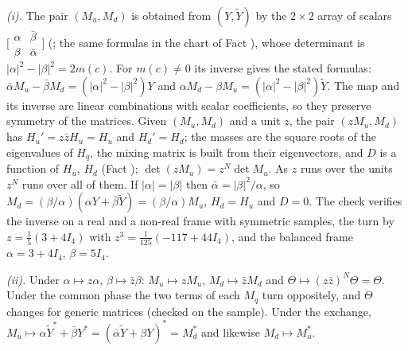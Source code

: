 \emph{(i).} The pair $(M_{u}, M_{d})$ is obtained from $(Y, \tilde{Y})$ by the $2 \times 2$ array of scalars $\bigl[\begin{smallmatrix}\alpha & \bar{\beta} \\ \beta & \bar{\alpha}\end{smallmatrix}\bigr]$ (; the same formulas in the chart of Fact ), whose determinant is $|\alpha|^{2} - |\beta|^{2} = 2m(c)$. For $m(c) \neq 0$ its inverse gives the stated formulas: $\bar{\alpha}M_{u} - \bar{\beta}M_{d} = (|\alpha|^{2} - |\beta|^{2})Y$ and $\alpha M_{d} - \beta M_{u} = (|\alpha|^{2} - |\beta|^{2})\tilde{Y}$. The map and its inverse are linear combinations with scalar coefficients, so they preserve symmetry of the matrices. Given $(M_{u}, M_{d})$ and a unit $z$, the pair $(zM_{u}, M_{d})$ has $H_{u}' = z\bar{z}H_{u} = H_{u}$ and $H_{d}' = H_{d}$; the masses are the square roots of the eigenvalues of $H_{q}$, the mixing matrix is built from their eigenvectors, and $D$ is a function of $H_{u}$, $H_{d}$ (Fact ); $\det(zM_{u}) = z^{N}\det M_{u}$. As $z$ runs over the units $z^{N}$ runs over all of them. If $|\alpha| = |\beta|$ then $\bar{\alpha} = |\beta|^{2}/\alpha$, so $M_{d} = (\beta/\alpha)(\alpha Y + \bar{\beta}\tilde{Y}) = (\beta/\alpha)M_{u}$, $H_{d} = H_{u}$ and $D = 0$. The check verifies the inverse on a real and a non-real frame with symmetric samples, the turn by $z = \tfrac15(3 + 4I_{4})$ with $z^{3} = \tfrac{1}{125}(-117 + 44I_{4})$, and the balanced frame $\alpha = 3 + 4I_{4}$, $\beta = 5I_{4}$.

\emph{(ii).} Under $\alpha \mapsto z\alpha$, $\beta \mapsto \bar{z}\beta$: $M_{u} \mapsto zM_{u}$, $M_{d} \mapsto \bar{z}M_{d}$ and $\Theta \mapsto (z\bar{z})^{N}\Theta = \Theta$. Under the common phase the two terms of each $M_{q}$ turn oppositely, and $\Theta$ changes for generic matrices (checked on the sample). Under the exchange, $M_{u} \mapsto \alpha\tilde{Y}^{*} + \bar{\beta}Y^{*} = (\bar{\alpha}\tilde{Y} + \beta Y)^{*} = M_{d}^{*}$ and likewise $M_{d} \mapsto M_{u}^{*}$.

